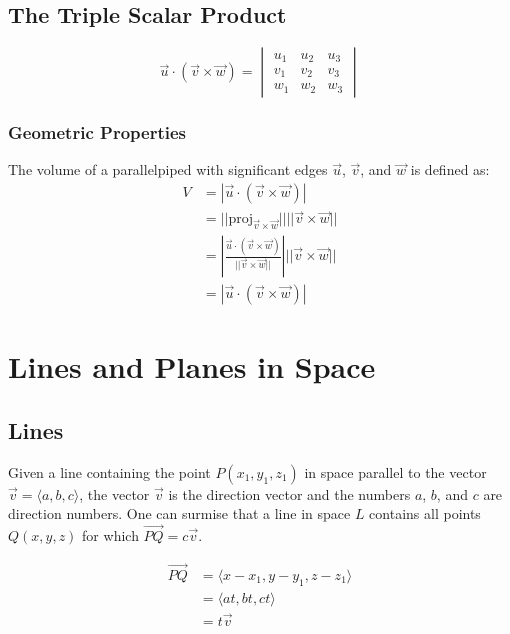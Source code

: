 \subsection{The Triple Scalar Product}
\begin{equation}
  \vec{u}\cdot(\vec{v}\times\vec{w})=\begin{vmatrix}
    u_1 & u_2 & u_3 \\
    v_1 & v_2 & v_3 \\
    w_1 & w_2 & w_3
  \end{vmatrix}
\end{equation}

\subsubsection{Geometric Properties}
The volume of a parallelpiped with significant edges $\vec{u}$, $\vec{v}$, and
$\vec{w}$ is defined as:
\begin{equation}
  \begin{aligned}
    V &= |\vec{u}\cdot(\vec{v}\times\vec{w})| \\
      &= ||\text{proj}_{\vec{v}\times\vec{w}}||||\vec{v}\times\vec{w}|| \\
      &= \left|\frac
        {\vec{u}\cdot(\vec{v}\times\vec{w})}
        {||\vec{v}\times\vec{w}||}\right|
        ||\vec{v}\times\vec{w}|| \\
      &= |\vec{u}\cdot(\vec{v}\times\vec{w})|
  \end{aligned}
\end{equation}

\section{Lines and Planes in Space}
\subsection{Lines}
Given a line containing the point $P(x_1,y_1,z_1)$ in space parallel to the
vector $\vec{v}=\langle a,b,c \rangle$, the vector $\vec{v}$ is the direction
vector and the numbers $a$, $b$, and $c$ are direction numbers. One can surmise
that a line in space $L$ contains all points $Q(x,y,z)$ for which
$\vec{PQ}=c\vec{v}$.

\begin{equation}
  \begin{aligned}
    \vec{PQ} &= \langle x-x_1, y-y_1, z-z_1 \rangle \\
             &= \langle at, bt, ct \rangle \\
             &= t\vec{v}
  \end{aligned}
\end{equation}

